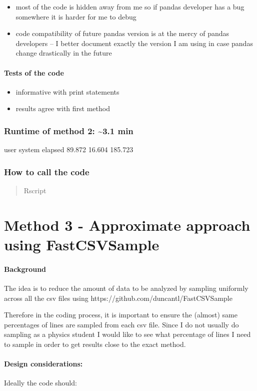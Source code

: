 \documentclass[letterpaper,10pt,english]{/usr/local/lib/python2.7/dist-packages/sphinx/texinputs/sphinxhowto}
\begin{document}
\begin{itemize}
\itemsep1pt\parskip0pt
\item
  most of the code is hidden away from me so if pandas developer has a
  bug somewhere it is harder for me to debug
\item
  code compatibility of future pandas version is at the mercy of pandas
  developers -- I better document exactly the version I am using in case
  pandas change drastically in the future
\end{itemize}\subsection{Tests of the code}\begin{itemize}
\itemsep1pt\parskip0pt
\item
  informative with print statements
\item
  results agree with first method
\end{itemize}\section{Runtime of method 2: \textasciitilde{}3.1 min}user system elapsed 89.872 16.604 185.723\section{How to call the code}\begin{quote}
Rscript
\end{quote}\part{Method 3 - Approximate approach using FastCSVSample}\subsection{Background}The idea is to reduce the amount of data to be analyzed by sampling
uniformly across all the csv files using
https://github.com/duncantl/FastCSVSample

Therefore in the coding process, it is important to ensure the (almost)
same percentages of lines are sampled from each csv file. Since I do not
usually do sampling as a physics student I would like to see what
percentage of lines I need to sample in order to get results close to
the exact method.\subsection{Design considerations:}Ideally the code should:
\end{document}
